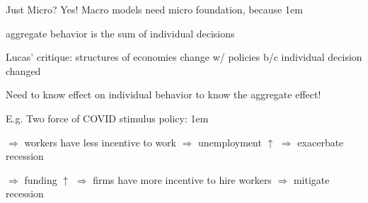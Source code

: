 \documentclass[11pt,aspectratio=43]{beamer}
\let\olditemize=\itemize
\let\endolditemize=\enditemize
\renewenvironment{itemize}{\olditemize \itemsep1em}{\endolditemize}
\let\oldenumerate=\enumerate
\let\endoldenumerate=\endenumerate
\renewenvironment{enumerate}{\oldenumerate \itemsep1em}{ \endoldenumerate}
\theoremstyle{definition}
\begin{document}
\begin{frame}{Just Micro?}
\label{slide:Just_Micro_}
    \alert{Yes!} Macro models need micro foundation, because
    \begin{itemize}
        \item aggregate behavior is the sum of individual decisions
        \item \alert{Lucas' critique}: structures of economies \alert{change} w/ policies b/c \alert{individual decision} changed
        \item Need to know effect on \alert{individual behavior} to know the aggregate effect!
        \item E.g. Two force of COVID stimulus policy:
        \begin{enumerate}
            \item $ \Rightarrow  $ workers have \alert{less} incentive to work $ \Rightarrow  $ unemployment $ \uparrow  $ $ \Rightarrow  $ exacerbate recession
            \item $ \Rightarrow  $ funding $ \uparrow  $ $ \Rightarrow  $ firms have \alert{more} incentive to hire workers $ \Rightarrow  $ mitigate recession
        \end{enumerate}
    \end{itemize}
\end{frame}
\end{document}
